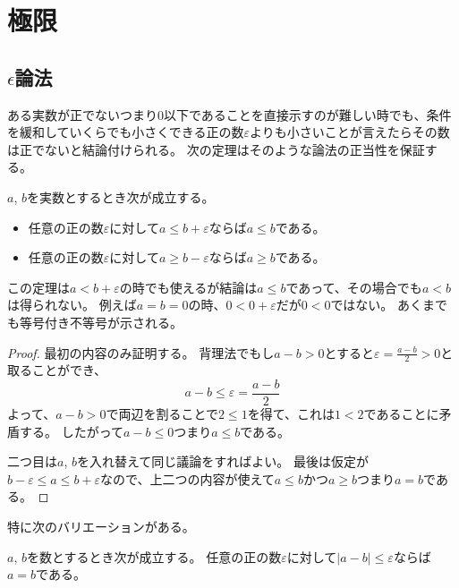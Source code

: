 
\chapter{極限}

\section{$\epsilon$論法}

ある実数が正でないつまり$0$以下であることを直接示すのが難しい時でも、条件を緩和していくらでも小さくできる正の数$\varepsilon$よりも小さいことが言えたらその数は正でないと結論付けられる。
次の定理はそのような論法の正当性を保証する。

\begin{theorem}
\label{t_ep_real}
$a$, $b$を実数とするとき次が成立する。
\begin{itemize}
\item
任意の正の数$\varepsilon$に対して$a \le b+\varepsilon$ならば$a \le b$である。
\item
任意の正の数$\varepsilon$に対して$a \ge b-\varepsilon$ならば$a \ge b$である。
\end{itemize}
\end{theorem}

\begin{remark}
この定理は$a < b+\varepsilon$の時でも使えるが結論は$a \le b$であって、その場合でも$a < b$は得られない。
例えば$a = b = 0$の時、$0 < 0+\varepsilon$だが$0 < 0$ではない。
あくまでも等号付き不等号が示される。
\end{remark}

\begin{proof}
最初の内容のみ証明する。
背理法でもし$a-b > 0$とすると$\varepsilon = \frac{a-b}{2} > 0$と取ることができ、
$$
a-b \le \varepsilon = \frac{a-b}{2}
$$
よって、$a-b > 0$で両辺を割ることで$2 \le 1$を得て、これは$1 < 2$であることに矛盾する。
したがって$a-b \le 0$つまり$a \le b$である。

二つ目は$a$, $b$を入れ替えて同じ議論をすればよい。
最後は仮定が$b-\varepsilon \le a \le b+\varepsilon$なので、上二つの内容が使えて$a \le b$かつ$a \ge b$つまり$a = b$である。
\end{proof}

特に次のバリエーションがある。

\begin{theorem}
\label{t_ep_number}
$a$, $b$を数とするとき次が成立する。
任意の正の数$\varepsilon$に対して$|a-b| \le \varepsilon$ならば$a = b$である。
\end{theorem}

